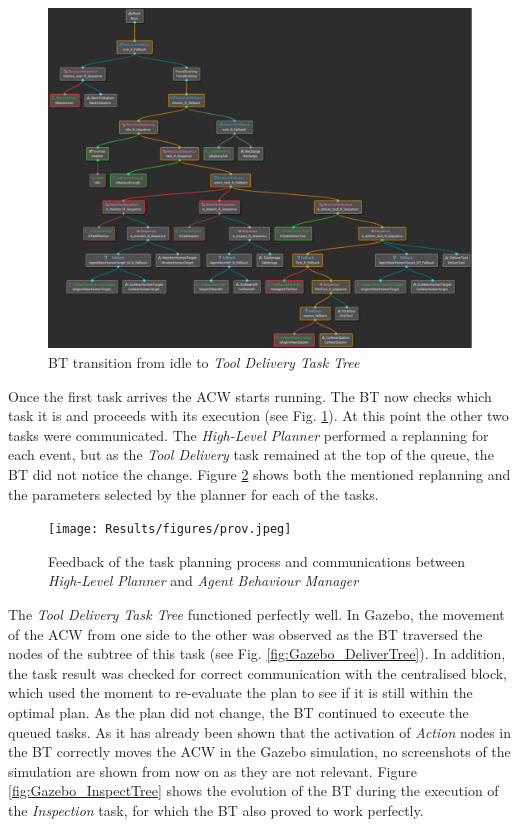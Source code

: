 \begin{figure}[htbp]
    \centering
    \includegraphics[width=.75\linewidth]{Results/figures/BTnoIdle.pdf}
    \caption{\gls{BT} transition from idle to \emph{Tool Delivery Task Tree}}
    \label{fig:NoIdle_DeliverToolTaskTree}
\end{figure}

Once the first task arrives the \gls{ACW} starts running. The \gls{BT} now checks which task it is and proceeds with its execution (see Fig. \ref{fig:NoIdle_DeliverToolTaskTree}). At this point the other two tasks were communicated. The \emph{High-Level Planner} performed a replanning for each event, but as the \emph{Tool Delivery} task remained at the top of the queue, the \gls{BT} did not notice the change. Figure \ref{fig:newtaskqueue} shows both the mentioned replanning and the parameters selected by the planner for each of the tasks.

\begin{figure}[htbp]
    \centering
    \texttt{[image: Results/figures/prov.jpeg]}
    \caption{Feedback of the task planning process and communications between \emph{High-Level Planner} and \emph{Agent Behaviour Manager}}
    \label{fig:newtaskqueue}
\end{figure}

The \emph{Tool Delivery Task Tree} functioned perfectly well. In Gazebo, the movement of the \gls{ACW} from one side to the other was observed as the \gls{BT} traversed the nodes of the subtree of this task (see Fig. \ref{fig:Gazebo_DeliverTree}). In addition, the task result was checked for correct communication with the centralised block, which used the moment to re-evaluate the plan to see if it is still within the optimal plan. As the plan did not change, the \gls{BT} continued to execute the queued tasks. As it has already been shown that the activation of \emph{Action} nodes in the \gls{BT} correctly moves the \gls{ACW} in the Gazebo simulation, no screenshots of the simulation are shown from now on as they are not relevant. Figure \ref{fig:Gazebo_InspectTree} shows the evolution of the \gls{BT} during the execution of the \emph{Inspection} task, for which the \gls{BT} also proved to work perfectly. 

